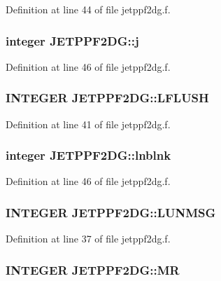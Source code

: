 Definition at line 44 of file jetppf2dg.f.\hypertarget{namespaceJETPPF2DG_8b427254180dae4e03e464db25432b89}{
\subsubsection[j]{\setlength{\rightskip}{0pt plus 5cm}integer {\bf JETPPF2DG::j}}}
\label{namespaceJETPPF2DG_8b427254180dae4e03e464db25432b89}




Definition at line 46 of file jetppf2dg.f.\hypertarget{namespaceJETPPF2DG_6db6d04641a552fe57c7f140cb8c09e6}{
\subsubsection[LFLUSH]{\setlength{\rightskip}{0pt plus 5cm}INTEGER {\bf JETPPF2DG::LFLUSH}}}
\label{namespaceJETPPF2DG_6db6d04641a552fe57c7f140cb8c09e6}




Definition at line 41 of file jetppf2dg.f.\hypertarget{namespaceJETPPF2DG_407321de285e0bcd8e697236b9c7a990}{
\subsubsection[lnblnk]{\setlength{\rightskip}{0pt plus 5cm}integer {\bf JETPPF2DG::lnblnk}}}
\label{namespaceJETPPF2DG_407321de285e0bcd8e697236b9c7a990}




Definition at line 46 of file jetppf2dg.f.\hypertarget{namespaceJETPPF2DG_258acbfd9dfc5ca34869c6edfdd89c8d}{
\subsubsection[LUNMSG]{\setlength{\rightskip}{0pt plus 5cm}INTEGER {\bf JETPPF2DG::LUNMSG}}}
\label{namespaceJETPPF2DG_258acbfd9dfc5ca34869c6edfdd89c8d}




Definition at line 37 of file jetppf2dg.f.\hypertarget{namespaceJETPPF2DG_5e02219aa819d9f9f40ffb1884684f2c}{
\subsubsection[MR]{\setlength{\rightskip}{0pt plus 5cm}INTEGER {\bf JETPPF2DG::MR}}}
\label{namespaceJETPPF2DG_5e02219aa819d9f9f40ffb1884684f2c}




